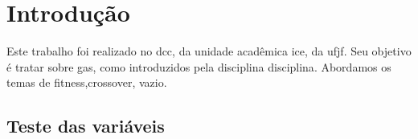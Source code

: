 \chapter{Introdução}%
\label{cap:introducao}


Este trabalho foi realizado no \gls{dcc}, da unidade acadêmica \gls{ice}, da \gls{ufjf}.
Seu objetivo é tratar sobre \glspl{ga}, como introduzidos pela disciplina \gls{disciplina}.
Abordamos os temas de \gls{fitness},\gls{crossover}, \gls{vazio}.

\section{Teste das variáveis}

\testaVariaveis{}

\lipsum[1-4]
